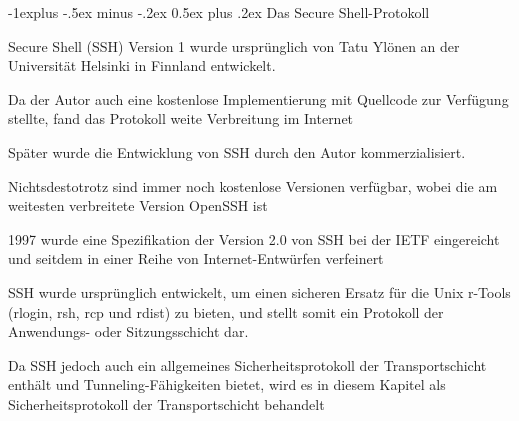 \documentclass[a4paper]{article}
\makeatletter
\renewcommand{\subsection}{\@startsection{subsection}{2}{0mm}%
 {-1explus -.5ex minus -.2ex}%
 {0.5ex plus .2ex}%
 {\normalfont\normalsize\bfseries}}
\makeatother
\begin{document}
\begin{multicols}{3}
      \subsection{Das Secure Shell-Protokoll}
      \begin{itemize*}
            \item Secure Shell (SSH) Version 1 wurde ursprünglich von Tatu Ylönen an der Universität Helsinki in Finnland entwickelt.
            \item Da der Autor auch eine kostenlose Implementierung mit Quellcode zur Verfügung stellte, fand das Protokoll weite Verbreitung im Internet
            \item Später wurde die Entwicklung von SSH durch den Autor kommerzialisiert.
            \item Nichtsdestotrotz sind immer noch kostenlose Versionen verfügbar, wobei die am weitesten verbreitete Version OpenSSH ist
            \item 1997 wurde eine Spezifikation der Version 2.0 von SSH bei der IETF eingereicht und seitdem in einer Reihe von Internet-Entwürfen verfeinert
            \item SSH wurde ursprünglich entwickelt, um einen sicheren Ersatz für die Unix r-Tools (rlogin, rsh, rcp und rdist) zu bieten, und stellt somit ein Protokoll der Anwendungs- oder Sitzungsschicht dar.
            \item Da SSH jedoch auch ein allgemeines Sicherheitsprotokoll der Transportschicht enthält und Tunneling-Fähigkeiten bietet, wird es in diesem Kapitel als Sicherheitsprotokoll der Transportschicht behandelt
      \end{itemize*}


\end{multicols}
\end{document}
